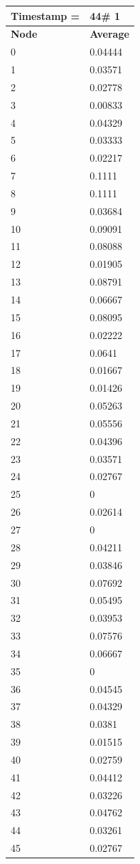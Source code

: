 \begin{tabular}{|l||l|}
\hline
\textbf{Timestamp =} & \textbf{44}\# 1\\\hline
	\textbf{Node} & \textbf{Average} \\ \hline
\hline
	0 & 0.04444 \\ \hline
	1 & 0.03571 \\ \hline
	2 & 0.02778 \\ \hline
	3 & 0.00833 \\ \hline
	4 & 0.04329 \\ \hline
	5 & 0.03333 \\ \hline
	6 & 0.02217 \\ \hline
	7 & 0.1111 \\ \hline
	8 & 0.1111 \\ \hline
	9 & 0.03684 \\ \hline
	10 & 0.09091 \\ \hline
	11 & 0.08088 \\ \hline
	12 & 0.01905 \\ \hline
	13 & 0.08791 \\ \hline
	14 & 0.06667 \\ \hline
	15 & 0.08095 \\ \hline
	16 & 0.02222 \\ \hline
	17 & 0.0641 \\ \hline
	18 & 0.01667 \\ \hline
	19 & 0.01426 \\ \hline
	20 & 0.05263 \\ \hline
	21 & 0.05556 \\ \hline
	22 & 0.04396 \\ \hline
	23 & 0.03571 \\ \hline
	24 & 0.02767 \\ \hline
	25 & 0 \\ \hline
	26 & 0.02614 \\ \hline
	27 & 0 \\ \hline
	28 & 0.04211 \\ \hline
	29 & 0.03846 \\ \hline
	30 & 0.07692 \\ \hline
	31 & 0.05495 \\ \hline
	32 & 0.03953 \\ \hline
	33 & 0.07576 \\ \hline
	34 & 0.06667 \\ \hline
	35 & 0 \\ \hline
	36 & 0.04545 \\ \hline
	37 & 0.04329 \\ \hline
	38 & 0.0381 \\ \hline
	39 & 0.01515 \\ \hline
	40 & 0.02759 \\ \hline
	41 & 0.04412 \\ \hline
	42 & 0.03226 \\ \hline
	43 & 0.04762 \\ \hline
	44 & 0.03261 \\ \hline
	45 & 0.02767 \\ \hline
\end{tabular}
